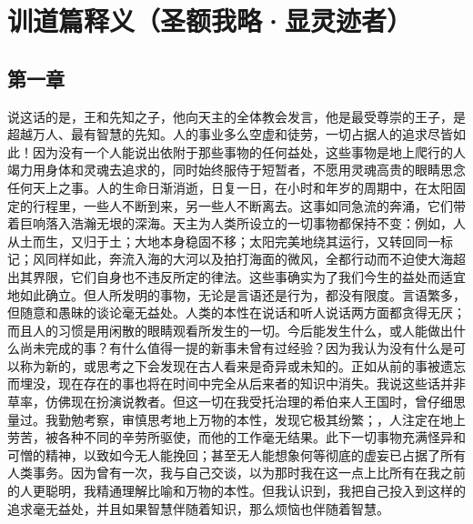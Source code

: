 
\chapter{训道篇释义（圣额我略·显灵迹者）}



\section{第一章}

说这话的是，王和先知之子，他向天主的全体教会发言，他是最受尊崇的王子，是超越万人、最有智慧的先知。人的事业多么空虚和徒劳，一切占据人的追求尽皆如此！因为没有一个人能说出依附于那些事物的任何益处，这些事物是地上爬行的人竭力用身体和灵魂去追求的，同时始终服侍于短暂者，不愿用灵魂高贵的眼睛思念任何天上之事。人的生命日渐消逝，日复一日，在小时和年岁的周期中，在太阳固定的行程里，一些人不断到来，另一些人不断离去。这事如同急流的奔涌，它们带着巨响落入浩瀚无垠的深海。天主为人类所设立的一切事物都保持不变：例如，人从土而生，又归于土；大地本身稳固不移；太阳完美地绕其运行，又转回同一标记；风同样如此，奔流入海的大河以及拍打海面的微风，全都行动而不迫使大海超出其界限，它们自身也不违反所定的律法。这些事确实为了我们今生的益处而适宜地如此确立。但人所发明的事物，无论是言语还是行为，都没有限度。言语繁多，但随意和愚昧的谈论毫无益处。人类的本性在说话和听人说话两方面都贪得无厌；而且人的习惯是用闲散的眼睛观看所发生的一切。今后能发生什么，或人能做出什么尚未完成的事？有什么值得一提的新事未曾有过经验？因为我认为没有什么是可以称为新的，或思考之下会发现在古人看来是奇异或未知的。正如从前的事被遗忘而埋没，现在存在的事也将在时间中完全从后来者的知识中消失。我说这些话并非草率，仿佛现在扮演说教者。但这一切在我受托治理的希伯来人王国时，曾仔细思量过。我勤勉考察，审慎思考地上万物的本性，发现它极其纷繁；，人注定在地上劳苦，被各种不同的辛劳所驱使，而他的工作毫无结果。此下一切事物充满怪异和可憎的精神，以致如今无人能挽回；甚至无人能想象何等彻底的虚妄已占据了所有人类事务。因为曾有一次，我与自己交谈，以为那时我在这一点上比所有在我之前的人更聪明，我精通理解比喻和万物的本性。但我认识到，我把自己投入到这样的追求毫无益处，并且如果智慧伴随着知识，那么烦恼也伴随着智慧。\par

